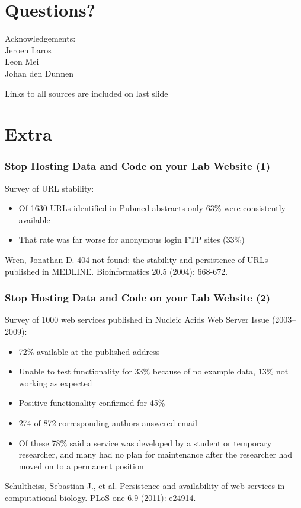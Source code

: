 \documentclass[slidestop]{beamer}
\begin{document}
\section*{Questions?}
\lastpagetemplate
\begin{frame}
  \begin{center}
    Acknowledgements:\\
    \vspace{0.8cm}
    Jeroen Laros\\
    Leon Mei\\
    Johan den Dunnen
  \end{center}
  \vspace{1cm}
  {\tiny
    Links to all sources are included on last slide
  }
\end{frame}

\section*{Extra}

\extrapagetemplate
\begin{frame}
  \frametitle{Stop Hosting Data and Code on your Lab Website (1)}
  Survey of URL stability:
  \begin{itemize}
    \item Of 1630 URLs identified in Pubmed abstracts only 63\% were
      consistently available
    \item That rate was far worse for anonymous login FTP sites (33\%)
  \end{itemize}
  Wren, Jonathan D. 404 not found: the stability and persistence of URLs
  published in MEDLINE. Bioinformatics 20.5 (2004): 668-672.
\end{frame}

\extrapagetemplate
\begin{frame}
  \frametitle{Stop Hosting Data and Code on your Lab Website (2)}
  Survey of 1000 web services published in Nucleic Acids Web
  Server Issue (2003--2009):
  \begin{itemize}
    \item 72\% available at the published address
    \item Unable to test functionality for 33\% because of no example data,
      13\% not working as expected
    \item Positive functionality confirmed for 45\%
    \item 274 of 872 corresponding authors answered email
    \item Of these 78\% said a service was developed by a student or temporary
      researcher, and many had no plan for maintenance after the researcher
      had moved on to a permanent position
  \end{itemize}
  Schultheiss, Sebastian J., et al. Persistence and availability of web
  services in computational biology. PLoS one 6.9 (2011): e24914.
\end{frame}
\end{document}
